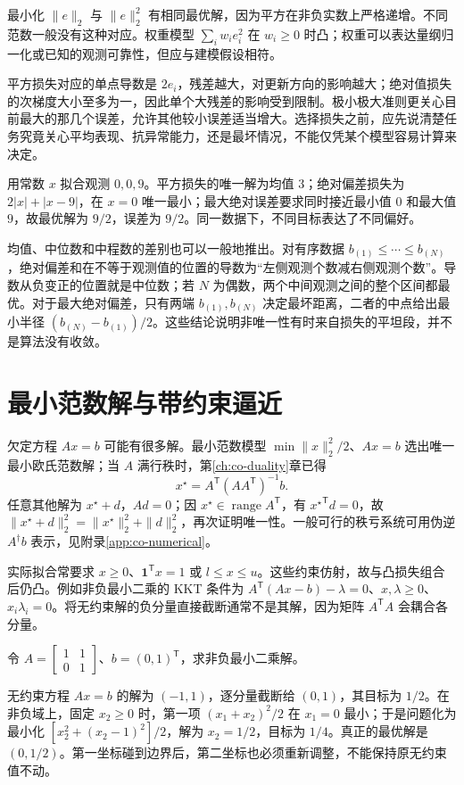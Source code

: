 \documentclass[UTF8,12pt,a4paper,fontset=fandol]{ctexbook}
\begin{document}
最小化 $\|e\|_2$ 与 $\|e\|_2^2$ 有相同最优解，因为平方在非负实数上严格递增。不同范数一般没有这种对应。权重模型 $\sum_iw_i e_i^2$ 在 $w_i\geq0$ 时凸；权重可以表达量纲归一化或已知的观测可靠性，但应与建模假设相符。

平方损失对应的单点导数是 $2e_i$，残差越大，对更新方向的影响越大；绝对值损失的次梯度大小至多为一，因此单个大残差的影响受到限制。极小极大准则更关心目前最大的那几个误差，允许其他较小误差适当增大。选择损失之前，应先说清楚任务究竟关心平均表现、抗异常能力，还是最坏情况，不能仅凭某个模型容易计算来决定。

\begin{example}[均值、中位数与中程数]
用常数 $x$ 拟合观测 $0,0,9$。平方损失的唯一解为均值 $3$；绝对偏差损失为 $2|x|+|x-9|$，在 $x=0$ 唯一最小；最大绝对误差要求同时接近最小值 $0$ 和最大值 $9$，故最优解为 $9/2$，误差为 $9/2$。同一数据下，不同目标表达了不同偏好。
\end{example}

均值、中位数和中程数的差别也可以一般地推出。对有序数据 $b_{(1)}\leq\cdots\leq b_{(N)}$，绝对偏差和在不等于观测值的位置的导数为“左侧观测个数减右侧观测个数”。导数从负变正的位置就是中位数；若 $N$ 为偶数，两个中间观测之间的整个区间都最优。对于最大绝对偏差，只有两端 $b_{(1)},b_{(N)}$ 决定最坏距离，二者的中点给出最小半径 $(b_{(N)}-b_{(1)})/2$。这些结论说明非唯一性有时来自损失的平坦段，并不是算法没有收敛。

\section{最小范数解与带约束逼近}

欠定方程 $Ax=b$ 可能有很多解。最小范数模型 $\min\|x\|_2^2/2$、$Ax=b$ 选出唯一最小欧氏范数解；当 $A$ 满行秩时，第\ref{ch:co-duality}章已得
\[
 x^\star=A^{\mathsf T}(AA^{\mathsf T})^{-1}b.
\]
任意其他解为 $x^\star+d$，$Ad=0$；因 $x^\star\in\operatorname{range}A^{\mathsf T}$，有 ${x^\star}^{\mathsf T}d=0$，故 $\|x^\star+d\|_2^2=\|x^\star\|_2^2+\|d\|_2^2$，再次证明唯一性。一般可行的秩亏系统可用伪逆 $A^\dagger b$ 表示，见附录\ref{app:co-numerical}。

实际拟合常要求 $x\geq0$、$\mathbf1^{\mathsf T}x=1$ 或 $l\leq x\leq u$。这些约束仿射，故与凸损失组合后仍凸。例如非负最小二乘的 KKT 条件为 $A^{\mathsf T}(Ax-b)-\lambda=0$、$x,\lambda\geq0$、$x_i\lambda_i=0$。将无约束解的负分量直接截断通常不是其解，因为矩阵 $A^{\mathsf T}A$ 会耦合各分量。

\begin{example}[为什么不能总是先拟合再截断]
令 $A=\left[\begin{smallmatrix}1&1\\0&1\end{smallmatrix}\right]$、$b=(0,1)^{\mathsf T}$，求非负最小二乘解。
\end{example}
\begin{solve}
无约束方程 $Ax=b$ 的解为 $(-1,1)$，逐分量截断给 $(0,1)$，其目标为 $1/2$。在非负域上，固定 $x_2\geq0$ 时，第一项 $(x_1+x_2)^2/2$ 在 $x_1=0$ 最小；于是问题化为最小化 $[x_2^2+(x_2-1)^2]/2$，解为 $x_2=1/2$，目标为 $1/4$。真正的最优解是 $(0,1/2)$。第一坐标碰到边界后，第二坐标也必须重新调整，不能保持原无约束值不动。
\end{solve}
\end{document}
